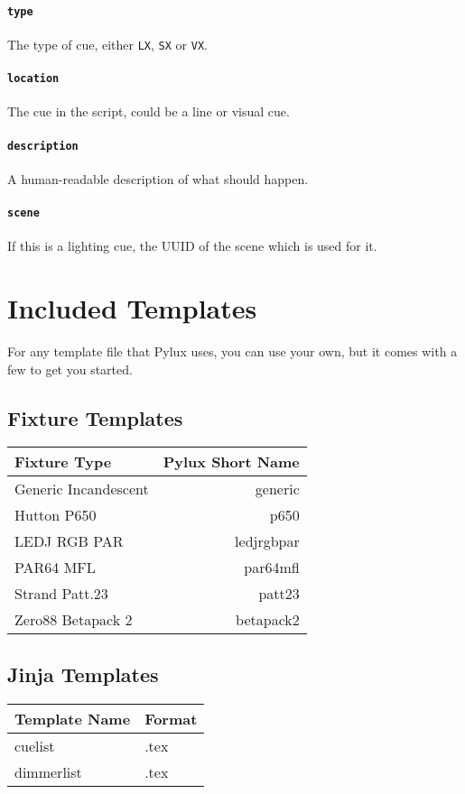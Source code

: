 \documentclass[a4paper]{article}
\begin{document}
\paragraph{\texttt{type}}
The type of cue, either \texttt{LX}, \texttt{SX} or \texttt{VX}.

\paragraph{\texttt{location}}
The cue in the script, could be a line or visual cue.

\paragraph{\texttt{description}}
A human-readable description of what should happen.

\paragraph{\texttt{scene}}
If this is a lighting cue, the UUID of the scene which is used for it.

\appendix
\section{Included Templates}
For any template file that Pylux uses, you can use your own, but it comes 
with a few to get you started.

\subsection{Fixture Templates}
\begin{longtable}{|l|r|}
\hline
Fixture Type & Pylux Short Name \\ \hline
Generic Incandescent & generic \\
Hutton P650 & p650 \\
LEDJ RGB PAR & ledjrgbpar \\
PAR64 MFL & par64mfl \\
Strand Patt.23 & patt23 \\
Zero88 Betapack 2 & betapack2 \\
\hline
\end{longtable}

\subsection{Jinja Templates}
\begin{longtable}{|l|l|}
\hline
Template Name & Format \\ \hline
cuelist & .tex \\
dimmerlist & .tex \\
\hline
\end{longtable}
\end{document}
